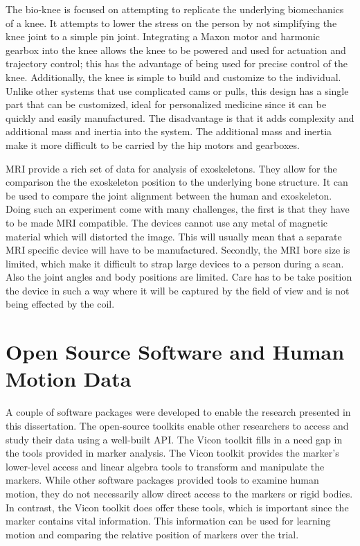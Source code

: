 The bio-knee is focused on attempting to replicate the underlying biomechanics of a knee. It attempts to lower the stress on the person by not simplifying the knee joint to a simple pin joint. Integrating a Maxon motor and harmonic gearbox into the knee allows the knee to be powered and used for actuation and trajectory control; this has the advantage of being used for precise control of the knee. Additionally, the knee is simple to build and customize to the individual. Unlike other systems that use complicated cams or pulls, this design has a single part that can be customized, ideal for personalized medicine since it can be quickly and easily manufactured. The disadvantage is that it adds complexity and additional mass and inertia into the system. The additional mass and inertia make it more difficult to be carried by the hip motors and gearboxes.

MRI provide a rich set of data for analysis of exoskeletons. They allow for the comparison the the exoskeleton position to the underlying bone structure. It can be used to compare the joint alignment between the human and exoskeleton. Doing such an experiment come with many challenges, the first is that they have to be made MRI compatible. The devices cannot use any metal of magnetic material which will distorted the image. This will usually mean that a separate MRI specific device will have to be manufactured. Secondly, the MRI bore size is limited, which make it difficult to strap large devices to a person during a scan. Also the joint angles and body positions are limited. Care has to be take position the device in such a way where it will be captured by the field of view and is not being effected by the coil. 


\section{Open Source Software and Human Motion Data}

A couple of software packages were developed to enable the research presented in this dissertation. The open-source toolkits enable other researchers to access and study their data using a well-built API. The Vicon toolkit fills in a need gap in the tools provided in marker analysis. The Vicon toolkit provides the marker's lower-level access and linear algebra tools to transform and manipulate the markers. While other software packages provided tools to examine human motion, they do not necessarily allow direct access to the markers or rigid bodies. In contrast, the Vicon toolkit does offer these tools, which is important since the marker contains vital information. This information can be used for learning motion and comparing the relative position of markers over the trial. 

